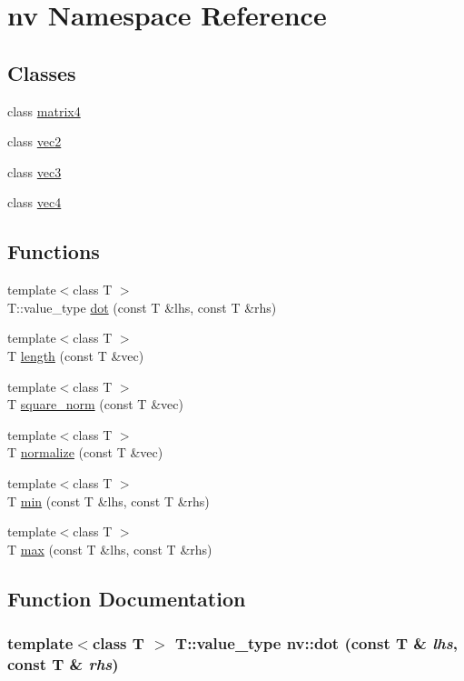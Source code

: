 \hypertarget{namespacenv}{
\section{nv Namespace Reference}
\label{namespacenv}
}
\subsection*{Classes}
\begin{CompactItemize}
\item 
class \hyperlink{classnv_1_1matrix4}{matrix4}
\item 
class \hyperlink{classnv_1_1vec2}{vec2}
\item 
class \hyperlink{classnv_1_1vec3}{vec3}
\item 
class \hyperlink{classnv_1_1vec4}{vec4}
\end{CompactItemize}
\subsection*{Functions}
\begin{CompactItemize}
\item 
{\footnotesize template$<$class T $>$ }\\T::value\_\-type \hyperlink{namespacenv_5c455557891bb5317d4234b552e78c11}{dot} (const T \&lhs, const T \&rhs)
\item 
{\footnotesize template$<$class T $>$ }\\T \hyperlink{namespacenv_e8621e0f559a4060f4376b8283237f2a}{length} (const T \&vec)
\item 
{\footnotesize template$<$class T $>$ }\\T \hyperlink{namespacenv_4c16f1e337fc10195895f4da5c4de603}{square\_\-norm} (const T \&vec)
\item 
{\footnotesize template$<$class T $>$ }\\T \hyperlink{namespacenv_4722b7c7e18ea4b7082ae015ed471f3e}{normalize} (const T \&vec)
\item 
{\footnotesize template$<$class T $>$ }\\T \hyperlink{namespacenv_d386b01e72b1573895911d11c8a8bc1f}{min} (const T \&lhs, const T \&rhs)
\item 
{\footnotesize template$<$class T $>$ }\\T \hyperlink{namespacenv_06a746f1a320a378520c41744045808a}{max} (const T \&lhs, const T \&rhs)
\end{CompactItemize}


\subsection{Function Documentation}
\hypertarget{namespacenv_5c455557891bb5317d4234b552e78c11}{
\subsubsection[{dot}]{\setlength{\rightskip}{0pt plus 5cm}template$<$class T $>$ T::value\_\-type nv::dot (const T \& {\em lhs}, \/  const T \& {\em rhs})}}
\label{namespacenv_5c455557891bb5317d4234b552e78c11}



